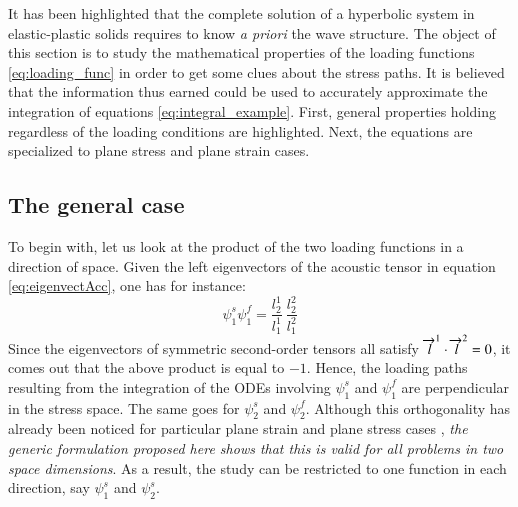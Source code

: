 It has been highlighted that the complete solution of a hyperbolic system in elastic-plastic solids requires to know \textit{a priori} the wave structure.
The object of this section is to study the mathematical properties of the loading functions \eqref{eq:loading_func} in order to get some clues about the stress paths.
It is believed that the information thus earned could be used to accurately approximate the integration of equations \eqref{eq:integral_example}.
First, general properties holding regardless of the loading conditions are highlighted.
Next, the equations are specialized to plane stress and plane strain cases.

\subsection{The general case}
To begin with, let us look at the product of the two loading functions in a direction of space.
Given the left eigenvectors of the acoustic tensor in equation \eqref{eq:eigenvectAcc}, one has for instance:
\begin{equation*}
  \psi^s_1\psi^f_1 = \frac{l^1_2}{l^1_1}\: \frac{l_2^2}{l^2_1}  
\end{equation*}
Since the eigenvectors of symmetric second-order tensors all satisfy ${\overrightarrow{l}}^1 \cdot {\overrightarrow{l}}^2=0$, it comes out that the above product is equal to $-1$.
Hence, the loading paths resulting from the integration of the ODEs involving $\psi^s_1$ and $\psi^f_1$ are perpendicular in the stress space.
The same goes for $\psi^s_2 $ and $\psi^f_2 $.
Although this orthogonality has already been noticed for particular plane strain and plane stress cases \cite{Clifton,Ting68}, \emph{the generic formulation proposed here shows that this is valid for all problems in two space dimensions}. 
As a result, the study can be restricted to one function in each direction, say $\psi_1^s$ and $\psi_2^s$.


